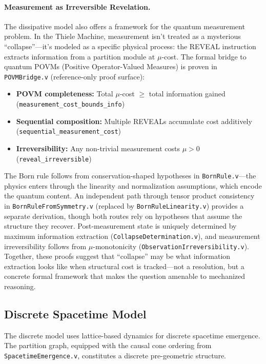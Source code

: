 \paragraph{Measurement as Irreversible Revelation.}

The dissipative model also offers a framework for the quantum measurement problem. In the Thiele Machine, measurement isn't treated as a mysterious ``collapse''---it's modeled as a specific physical process: the REVEAL instruction extracts information from a partition module at $\mu$-cost. The formal bridge to quantum POVMs (Positive Operator-Valued Measures) is proven in \texttt{POVMBridge.v} (reference-only proof surface):
\begin{itemize}
    \item \textbf{POVM completeness:} Total $\mu$-cost $\geq$ total information gained (\texttt{measurement\_cost\_bounds\_info})
    \item \textbf{Sequential composition:} Multiple REVEALs accumulate cost additively (\texttt{sequential\_measurement\_cost})
    \item \textbf{Irreversibility:} Any non-trivial measurement costs $\mu > 0$ (\texttt{reveal\_irreversible})
\end{itemize}
The Born rule follows from conservation-shaped hypotheses in \texttt{BornRule.v}---the physics enters through the linearity and normalization assumptions, which encode the quantum content. An independent path through tensor product consistency in \texttt{BornRuleFromSymmetry.v} (replaced by \texttt{BornRuleLinearity.v}) provides a separate derivation, though both routes rely on hypotheses that assume the structure they recover. Post-measurement state is uniquely determined by maximum information extraction (\texttt{CollapseDetermination.v}), and measurement irreversibility follows from $\mu$-monotonicity (\texttt{ObservationIrreversibility.v}). Together, these proofs suggest that ``collapse'' may be what information extraction looks like when structural cost is tracked---not a resolution, but a concrete formal framework that makes the question amenable to mechanized reasoning.

\subsection{Discrete Spacetime Model}

The discrete model uses lattice-based dynamics for discrete spacetime emergence. The partition graph, equipped with the causal cone ordering from \texttt{SpacetimeEmergence.v}, constitutes a discrete pre-geometric structure.

